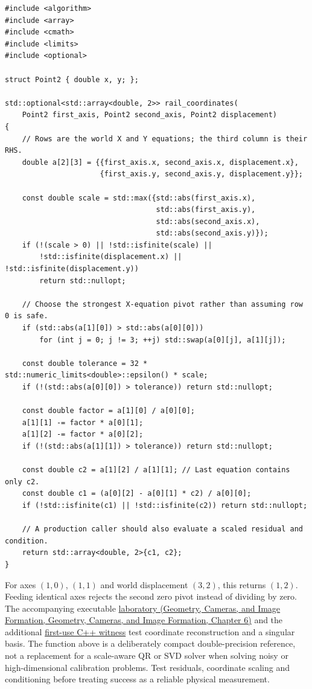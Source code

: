 \begin{verbatim}
#include <algorithm>
#include <array>
#include <cmath>
#include <limits>
#include <optional>

struct Point2 { double x, y; };

std::optional<std::array<double, 2>> rail_coordinates(
    Point2 first_axis, Point2 second_axis, Point2 displacement)
{
    // Rows are the world X and Y equations; the third column is their RHS.
    double a[2][3] = {{first_axis.x, second_axis.x, displacement.x},
                      {first_axis.y, second_axis.y, displacement.y}};

    const double scale = std::max({std::abs(first_axis.x),
                                   std::abs(first_axis.y),
                                   std::abs(second_axis.x),
                                   std::abs(second_axis.y)});
    if (!(scale > 0) || !std::isfinite(scale) ||
        !std::isfinite(displacement.x) || !std::isfinite(displacement.y))
        return std::nullopt;

    // Choose the strongest X-equation pivot rather than assuming row 0 is safe.
    if (std::abs(a[1][0]) > std::abs(a[0][0]))
        for (int j = 0; j != 3; ++j) std::swap(a[0][j], a[1][j]);

    const double tolerance = 32 * std::numeric_limits<double>::epsilon() * scale;
    if (!(std::abs(a[0][0]) > tolerance)) return std::nullopt;

    const double factor = a[1][0] / a[0][0];
    a[1][1] -= factor * a[0][1];
    a[1][2] -= factor * a[0][2];
    if (!(std::abs(a[1][1]) > tolerance)) return std::nullopt;

    const double c2 = a[1][2] / a[1][1]; // Last equation contains only c2.
    const double c1 = (a[0][2] - a[0][1] * c2) / a[0][0];
    if (!std::isfinite(c1) || !std::isfinite(c2)) return std::nullopt;

    // A production caller should also evaluate a scaled residual and condition.
    return std::array<double, 2>{c1, c2};
}
\end{verbatim}

For axes \((1,0)\), \((1,1)\) and world displacement \((3,2)\), this returns \((1,2)\). Feeding identical axes rejects the second zero pivot instead of dividing by zero. The accompanying executable \href{../03-Geometry-Cameras-and-Image-Formation/main.pdf\#nameddest=02-foundations-ii-ch037-a-complete-scalar-laboratory-makes-the-story-executable}{laboratory (Geometry, Cameras, and Image Formation, Geometry, Cameras, and Image Formation, Chapter 6)} and the additional \hyperref[source-file-a41016f2e326b40cdff18ff4]{first-use C++ witness} test coordinate reconstruction and a singular basis. The function above is a deliberately compact double-precision reference, not a replacement for a scale-aware QR or SVD solver when solving noisy or high-dimensional calibration problems. Test residuals, coordinate scaling and conditioning before treating success as a reliable physical measurement.

